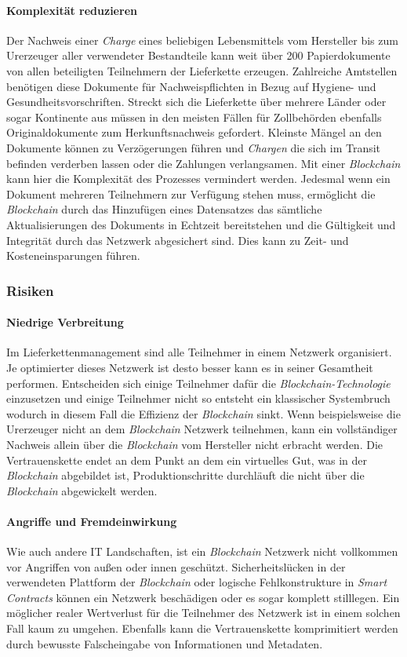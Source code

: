 \paragraph{Komplexität reduzieren}
Der Nachweis einer \textit{Charge} eines beliebigen Lebensmittels vom Hersteller bis zum Urerzeuger aller verwendeter Bestandteile kann weit über 200 Papierdokumente von allen beteiligten Teilnehmern der Lieferkette erzeugen. Zahlreiche Amtstellen benötigen diese Dokumente für Nachweispflichten in Bezug auf Hygiene- und Gesundheitsvorschriften. Streckt sich die Lieferkette über mehrere Länder oder sogar Kontinente aus müssen in den meisten Fällen für Zollbehörden ebenfalls Originaldokumente zum Herkunftsnachweis gefordert. Kleinste Mängel an den Dokumente können zu Verzögerungen führen und \textit{Chargen} die sich im Transit befinden verderben lassen oder die Zahlungen verlangsamen. Mit einer \textit{Blockchain} kann hier die Komplexität des Prozesses vermindert werden. Jedesmal wenn ein Dokument mehreren Teilnehmern zur Verfügung stehen muss, ermöglicht die \textit{Blockchain} durch das Hinzufügen eines Datensatzes das sämtliche Aktualisierungen des Dokuments in Echtzeit bereitstehen und die Gültigkeit und Integrität durch das Netzwerk abgesichert sind. Dies kann zu Zeit- und Kosteneinsparungen führen.

\subsubsection{Risiken}
\paragraph{Niedrige Verbreitung}
Im Lieferkettenmanagement sind alle Teilnehmer in einem Netzwerk organisiert. Je optimierter dieses Netzwerk ist desto besser kann es in seiner Gesamtheit performen. Entscheiden sich einige Teilnehmer dafür die \textit{Blockchain-Technologie} einzusetzen und einige Teilnehmer nicht so entsteht ein klassischer Systembruch wodurch in diesem Fall die Effizienz der \textit{Blockchain} sinkt. Wenn beispielsweise die Urerzeuger nicht an dem \textit{Blockchain} Netzwerk teilnehmen, kann ein vollständiger Nachweis allein über die \textit{Blockchain} vom Hersteller nicht erbracht werden. Die Vertrauenskette endet an dem Punkt an dem ein virtuelles Gut, was in der \textit{Blockchain} abgebildet ist, Produktionschritte durchläuft die nicht über die \textit{Blockchain} abgewickelt werden. 

\paragraph{Angriffe und Fremdeinwirkung}
Wie auch andere IT Landschaften, ist ein \textit{Blockchain} Netzwerk nicht vollkommen vor Angriffen von außen oder innen geschützt. Sicherheitslücken in der verwendeten Plattform der \textit{Blockchain} oder logische Fehlkonstrukture in \textit{Smart Contracts} können ein Netzwerk beschädigen oder es sogar komplett stilllegen. Ein möglicher realer Wertverlust für die Teilnehmer des Netzwerk ist in einem solchen Fall kaum zu umgehen. Ebenfalls kann die Vertrauenskette komprimitiert werden durch bewusste Falscheingabe von Informationen und Metadaten. 

